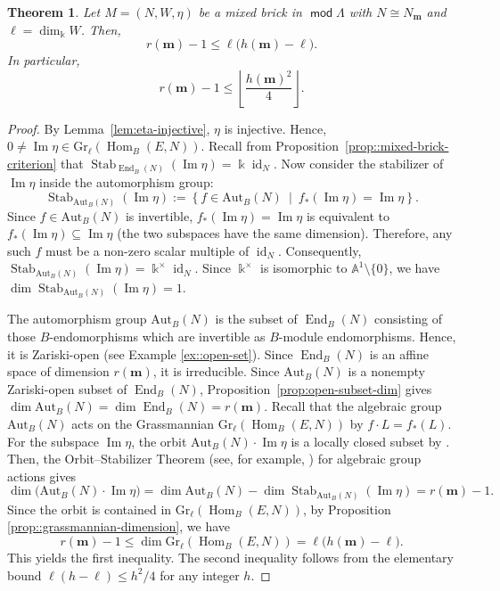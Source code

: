 \documentclass[a4,12pt]{amsart}
\numberwithin{equation}{section} %
\def\Hom{\operatorname{Hom}} %
\def\End{\operatorname{End}} %
\def\Im{\operatorname{Im}} %
\def\Stab{\operatorname{Stab}} %
\def\mod{\operatorname{\mathsf{mod}}}
\def\Gr{\mathrm{Gr}} %
\def\Aut{\mathrm{Aut}} %
\newtheorem{theorem}{Theorem}[section] %
\theoremstyle{definition} %
\begin{document}
\begin{theorem}\label{thm:dim-conditions}
Let $M=(N,W,\eta)$ be a mixed brick in $\mod \Lambda$ with $N\cong N_{\mathbf{m}}$ and 
$\ell=\dim_{\Bbbk}W$. Then, 
\[
r(\mathbf{m})-1 \leq \ell\bigl(h(\mathbf{m})-\ell\bigr).
\]
In particular,
\[
r(\mathbf{m})-1
\leq
\left\lfloor \frac{h(\mathbf{m})^2}{4}\right\rfloor.
\]
\end{theorem}
\begin{proof}
By Lemma~\ref{lem:eta-injective}, $\eta$ is injective.
Hence, $0\neq \Im\eta\in \Gr_{\ell}(\Hom_B(E,N))$. Recall from Proposition~\ref{prop::mixed-brick-criterion} that $\Stab_{\End_B(N)}(\Im\eta)=\Bbbk\operatorname{id}_{N}$. Now consider the stabilizer of $\Im\eta$ inside the automorphism group:
\[
\Stab_{\Aut_B(N)}(\Im\eta):=
\left\{
f\in\Aut_B(N) \ \middle|\ f_*(\Im\eta)=\Im\eta
\right\}.
\]
Since $f\in\Aut_B(N)$ is invertible, $f_*(\Im\eta)=\Im\eta$ is equivalent to $f_*(\Im\eta)\subseteq\Im\eta$ (the two subspaces have the same dimension). Therefore, any such $f$ must be a non-zero scalar multiple of $\operatorname{id}_{N}$. Consequently, $\Stab_{\Aut_B(N)}(\Im\eta)=\Bbbk^{\times}\operatorname{id}_{N}$. Since $\Bbbk^{\times}$ is isomorphic to $\mathbb{A}^1\setminus\{0\}$, we have $\dim\Stab_{\Aut_B(N)}(\Im\eta)=1$.

The automorphism group $\Aut_B(N)$ is the subset of $\End_B(N)$ consisting of those $B$-endomorphisms which are invertible as $B$-module endomorphisms. Hence, it is Zariski-open (see Example \ref{ex::open-set}). Since $\End_B(N)$ is an affine space of dimension $r(\mathbf{m})$, it is irreducible. Since $\Aut_B(N)$ is a nonempty Zariski-open subset of $\End_B(N)$, Proposition~\ref{prop:open-subset-dim} gives $\dim\Aut_B(N)=\dim\End_B(N)=r(\mathbf{m})$. Recall that the algebraic group $\Aut_B(N)$ acts on the Grassmannian $\Gr_{\ell}(\Hom_B(E,N))$ by $f\cdot L=f_*(L)$. For the subspace $\Im\eta$, the orbit $\Aut_B(N)\cdot \Im\eta$ is a locally closed subset by \cite[II. Proposition 8.3]{Humphreys-book-1975}. Then, the Orbit–Stabilizer Theorem (see, for example, \cite[Proposition 1.11]{Brion-actions-2010}) for algebraic group actions gives
\[
\dim\bigl(\Aut_B(N)\cdot\Im\eta\bigr)
= \dim\Aut_B(N)-\dim\Stab_{\Aut_B(N)}(\Im\eta)
= r(\mathbf{m})-1.
\]
Since the orbit is contained in $\Gr_{\ell}(\Hom_B(E,N))$, by Proposition \ref{prop::grassmannian-dimension}, we have
\[
r(\mathbf{m})-1 \leq \dim\Gr_{\ell}(\Hom_B(E,N))=\ell\bigl(h(\mathbf{m})-\ell\bigr).
\]
This yields the first inequality. The second inequality follows from the elementary bound $\ell(h-\ell)\leq h^2/4$ for any integer $h$.
\end{proof}
\end{document}
